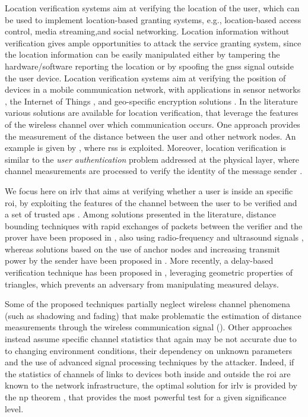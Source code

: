 \documentclass[draftcls,onecolumn,12pt]{IEEEtran}
\begin{document}
Location verification systems aim at verifying the location of the user, which can be used to implement location-based granting systems, e.g., location-based access control, media streaming,and social networking. Location information without verification gives ample opportunities to attack the service granting system, since the location information can be easily manipulated either by tampering the hardware/software reporting the location or by spoofing the \ac{gnss} signal outside the user device. Location verification systems aim at verifying the position of devices in a mobile communication network, with applications in sensor networks \cite{Zeng-survey, 8376254, wei2013}, the Internet of Things \cite{7903611}, and geo-specific encryption solutions \cite{quaglia}. In the literature various solutions are available for location verification, that leverage the features of the wireless channel over which communication occurs. One approach provides the measurement of the distance between the user and other network nodes. An example is given by \cite{yan2016location}, where \ac{rss} is exploited. Moreover, location verification is similar to the  {\em user authentication} problem addressed at the physical layer, where  channel measurements are  processed to verify the identity of the message sender \cite{7270404}. 

We focus here on \ac{irlv} that aims at verifying whether a user is inside an specific \ac{roi}, by exploiting the features of the channel between the user to be verified and a set of trusted \acp{ap} \cite{Zeng-survey}. Among solutions presented in the literature, distance bounding techniques with rapid exchanges of packets between the verifier and the prover have been proposed in \cite{Brands}, also using radio-frequency and ultrasound signals \cite{Sastry}, whereas solutions based on the use of anchor nodes and increasing transmit power by the sender have been proposed in \cite{Vora}. More recently, a delay-based verification technique has been proposed  in \cite{7145434}, leveraging geometric properties of triangles, which prevents an adversary from manipulating measured delays.  

Some of the proposed techniques partially neglect wireless channel phenomena (such as shadowing and fading) that make  problematic the estimation of distance measurements through the wireless communication signal (\cite{Brands,Sastry,Vora}). Other approaches instead assume specific channel statistics \cite{quaglia} that again may be not accurate due to to changing environment conditions, their dependency on unknown parameters and the use of advanced signal processing techniques by the attacker. Indeed, if the statistics of channels of links to devices both inside and outside the \ac{roi} are known to the network infrastructure, the optimal solution for \ac{irlv} is provided by the \ac{np} theorem \cite{Cover-book}, that provides the most powerful test for a given significance level. 
\end{document}
